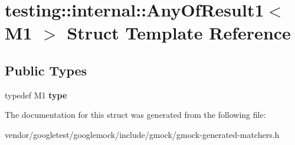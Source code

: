 \hypertarget{structtesting_1_1internal_1_1AnyOfResult1}{}\section{testing\+:\+:internal\+:\+:Any\+Of\+Result1$<$ M1 $>$ Struct Template Reference}
\label{structtesting_1_1internal_1_1AnyOfResult1}
\subsection*{Public Types}
\begin{DoxyCompactItemize}
\item 
typedef M1 {\bfseries type}\hypertarget{structtesting_1_1internal_1_1AnyOfResult1_a4c55b5cf196c93e2a822bc99625f6797}{}\label{structtesting_1_1internal_1_1AnyOfResult1_a4c55b5cf196c93e2a822bc99625f6797}

\end{DoxyCompactItemize}


The documentation for this struct was generated from the following file\+:\begin{DoxyCompactItemize}
\item 
vendor/googletest/googlemock/include/gmock/gmock-\/generated-\/matchers.\+h\end{DoxyCompactItemize}
